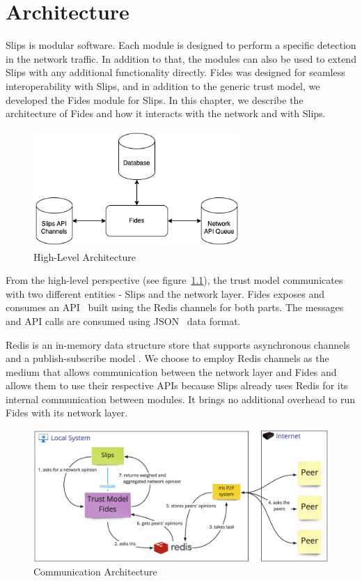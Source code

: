 \chapter{Architecture}
\label{ch:architecture}
Slips is modular software. Each module is designed to perform a specific detection in the network traffic.\cite{slips}
In addition to that, the modules can also be used to extend Slips with any additional functionality directly. 
Fides was designed for seamless interoperability with Slips, and in addition to the generic trust model, we developed the Fides module for Slips.
In this chapter, we describe the architecture of Fides and how it interacts with the network and with Slips.

\begin{figure}[ht]
    \centering
    \includegraphics[width=0.7\textwidth]{assets/high_architecture.png}
    \caption{High-Level Architecture}
    \label{fig:high-level-architecture}
\end{figure}

From the high-level perspective (see figure~\ref{fig:high-level-architecture}), the trust model communicates with two different entities - Slips and the network layer.
Fides exposes and consumes an API~\cite{api} built using the Redis channels for both parts.
The messages and API calls are consumed using JSON~\cite{json} data format.

Redis is an in-memory data structure store that supports asynchronous channels and a publish-subscribe model \cite{redis}.
We choose to employ Redis channels as the medium that allows communication between the network layer and Fides and allows them to use their respective APIs because Slips already uses Redis for its internal communication between modules. It brings no additional overhead to run Fides with its network layer.

\begin{figure}
    \centering
    \includegraphics[width=1.0\textwidth]{assets/communication_architecture.jpeg}
    \caption{Communication Architecture}
    \label{fig:high-leve-architecture-communication}
\end{figure}



